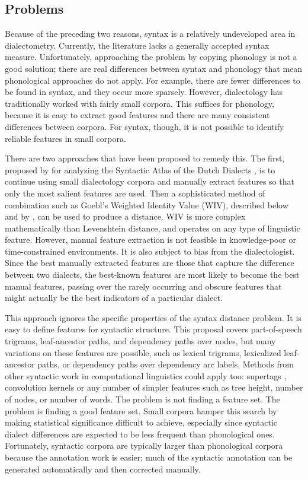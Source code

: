 \subsection{Problems}

Because of the preceding two reasons, syntax is a relatively
undeveloped area in dialectometry. Currently, the literature lacks a
generally accepted syntax measure. Unfortunately, approaching the
problem by copying phonology is not a good solution; there are real
differences between syntax and phonology that mean phonological
approaches do not apply. For example, there are fewer differences to be
found in syntax, and they occur more sparsely.
However, dialectology has traditionally worked with fairly small
corpora. This suffices for phonology, because
it is easy to extract good features and there are many
consistent differences between corpora. For syntax, though, it is not possible
to identify reliable features in small corpora.

There are two approaches that have been proposed to remedy this. The
first, proposed by  for analyzing the Syntactic
Atlas of the Dutch Dialects \cite{barbiers05}, is to continue using
small dialectology corpora and manually extract features so that only
the most salient features are used. Then a sophisticated method of
combination such as Goebl's Weighted Identity Value (WIV), described
below and by , can be used to produce a
distance. WIV is more complex mathematically than Levenshtein
distance, and operates on any type of linguistic feature. However, manual feature
extraction is not feasible in knowledge-poor or time-constrained
environments. It is also subject to bias from the
dialectologist. Since the best manually extracted features are those that capture
the difference between two dialects, the best-known features are most
likely to become the best manual features, passing over the rarely
occurring and obscure features that might actually be the best
indicators of a particular dialect.

This approach ignores the specific properties of the syntax distance
problem. It is easy to define features for syntactic structure. This
proposal covers part-of-speech trigrams, leaf-ancestor paths, and
dependency paths over nodes, but many variations on these features are
possible, such as lexical trigrams, lexicalized leaf-ancestor paths,
or dependency paths over dependency arc labels. Methods from other
syntactic work in computational linguistics could apply too: supertags
\cite{joshi94}, convolution kernels \cite{collins01} or any number of
simpler features such as tree height, number of nodes, or number of
words. The problem is not finding a feature set. The problem is
finding a good feature set. Small corpora hamper this search by making
statistical significance difficult to achieve, especially since
syntactic dialect differences are expected to be less frequent than
phonological ones. Fortunately, syntactic corpora are typically larger
than phonological corpora because the annotation work is easier; much
of the syntactic annotation can be generated automatically and then
corrected manually.

